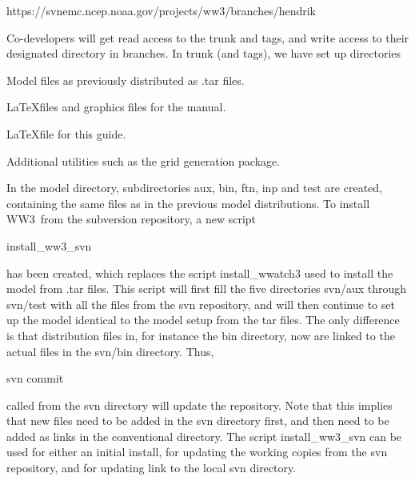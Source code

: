 \documentclass[12pt]{article}
\newcommand{\ws}{WW3}
\newcommand{\file}{\sf}
\newenvironment{flist}{\begin{list}{nofile ?}{\parsep 0mm
            \itemsep 0mm \leftmargin 35mm \labelwidth 25mm
            \rightmargin 10mm}}{\end{list}}
\newcommand{\fit}[2]{\item[{\file{#1}}\hfill]{#2}}
\begin{document}
\vspace{\baselineskip}
\centerline{\file https://svnemc.ncep.noaa.gov/projects/ww3/branches/hendrik}
\vspace{\baselineskip}

\noindent
Co-developers will get read access to the {\file trunk} and {\file tags}, and
write access to their designated directory in {\file branches}. In {\file
trunk} (and {\file tags}), we have set up directories

\begin{flist}
\fit{model }{Model files as previously distributed as {\file .tar} files.}
\fit{manual}{\LaTeX files and graphics files for the manual.}
\fit{guide }{\LaTeX file for this guide.}
\fit{utilities}{Additional utilities such as the grid generation package.}
\end{flist}

\noindent
In the {\file model} directory, subdirectories {\file aux}, {\file bin},
{\file ftn}, {\file inp} and {\file test} are created, containing the same
files as in the previous model distributions. To install \ws\ from the
subversion repository, a new script

\vspace{\baselineskip}
\centerline{\file install\_ww3\_svn}
\vspace{\baselineskip}

\noindent
has been created, which replaces the script {\file install\_wwatch3} used to
install the model from {\file .tar} files. This script will first fill the
five directories {\file svn/aux} through {\file svn/test} with all the files
from the svn repository, and will then continue to set up the model identical
to the model setup from the tar files. The only difference is that
distribution files in, for instance the {\file bin} directory, now are linked
to the actual files in the {\file svn/bin} directory. Thus,

\vspace{\baselineskip}
\centerline{\file svn commit}
\vspace{\baselineskip}

\noindent
called from the {\file svn} directory will update the repository. Note that
this implies that new files need to be added in the {\file svn} directory
first, and then need to be added as links in the conventional directory. The
script {\file install\_ww3\_svn} can be used for either an initial install,
for updating the working copies from the svn repository, and for updating link
to the local {\file svn} directory.
\end{document}
